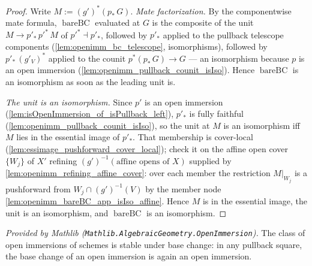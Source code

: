 \begin{proof}\leanok
  Write \(M := (g')^*(p_*\,G)\).  \emph{Mate factorization.}  By the componentwise mate formula,
  \(\operatorname{bareBC}\) evaluated at \(G\) is the composite of the unit
  \(M \to p'_*\,p'^*\,M\) of \(p'^* \dashv p'_*\), followed by \(p'_*\) applied to the pullback
  telescope components (\cref{lem:openimm_bc_telescope}, isomorphisms), followed by
  \(p'_*\,(g'_V)^*\) applied to the counit \(p^*(p_*\,G) \to G\) --- an isomorphism because
  \(p\) is an open immersion (\cref{lem:openimm_pullback_counit_isIso}).  Hence
  \(\operatorname{bareBC}\) is an isomorphism as soon as the leading unit is.

  \emph{The unit is an isomorphism.}  Since \(p'\) is an open immersion
  (\cref{lem:isOpenImmersion_of_isPullback_left}), \(p'_*\) is fully faithful
  (\cref{lem:openimm_pullback_counit_isIso}), so the unit at \(M\) is an isomorphism iff \(M\)
  lies in the essential image of \(p'_*\).  That membership is cover-local
  (\cref{lem:essimage_pushforward_cover_local}); check it on the affine open cover \(\{W_j\}\) of
  \(X'\) refining \((g')^{-1}(\text{affine opens of } X)\) supplied by
  \cref{lem:openimm_refining_affine_cover}: over each member the restriction \(M|_{W_j}\) is a
  pushforward from \(W_j \cap (g')^{-1}(V)\) by the member node
  \cref{lem:openimm_bareBC_app_isIso_affine}.  Hence \(M\) is in the essential image, the unit is
  an isomorphism, and \(\operatorname{bareBC}\) is an isomorphism.
\end{proof}

\begin{lemma}
  \label{lem:isOpenImmersion_stableUnderBaseChange_mathlib}
  \mathlibok
  \textit{Provided by Mathlib
  (\texttt{Mathlib.AlgebraicGeometry.OpenImmersion}).}
  The class of open immersions of schemes is stable under base change: in any pullback square,
  the base change of an open immersion is again an open immersion.
\end{lemma}

